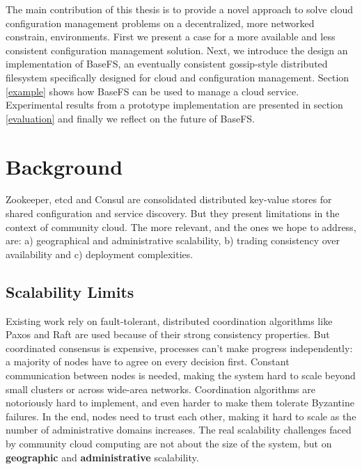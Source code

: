 \documentclass{sig-alternate}
\begin{document}
The main contribution of this thesis is to provide a novel approach to solve cloud configuration management problems on a decentralized, more networked constrain, environments. First we present a case for a more available and less consistent configuration management solution. Next, we introduce the design an implementation of BaseFS, an eventually consistent gossip-style distributed filesystem specifically designed for cloud and configuration management. Section \ref{example} shows how BaseFS can be used to manage a cloud service. Experimental results from a prototype implementation are presented in section \ref{evaluation} and finally we reflect on the future of BaseFS.

\section{Background}

Zookeeper, etcd and Consul are consolidated distributed key-value stores for shared configuration and service discovery. But they present limitations in the context of community cloud. The more relevant, and the ones we hope to address, are: a) geographical and administrative scalability, b) trading consistency over availability and c) deployment complexities.

\subsection{Scalability Limits}

Existing work rely on fault-tolerant, distributed coordination algorithms like Paxos\cite{lamport2001paxos} and Raft\cite{ongaro2014search} are used because of their strong consistency properties. But coordinated consensus is expensive, processes can't make progress independently: a majority of nodes have to agree on every decision first. Constant communication between nodes is needed, making the system hard to scale beyond small clusters or across wide-area networks. 
Coordination algorithms are notoriously hard to implement\cite{ongaro2014search}, and even harder to make them tolerate Byzantine failures. In the end, nodes need to trust each other, making it hard to scale as the number of administrative domains increases. The real scalability challenges faced by community cloud computing are not about the size of the system, but on \textbf{geographic} and \textbf{administrative} scalability.

\end{document}
